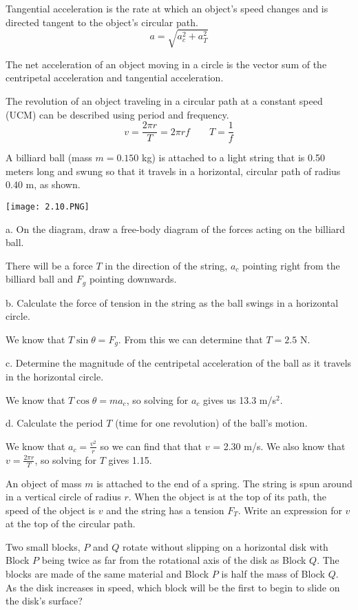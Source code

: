 \documentclass[../mech.tex]{subfiles}
\begin{document}
Tangential acceleration is the rate at which an object's speed changes and is directed tangent to the object's circular path. 
\[a=\sqrt{a_c^2+a_T^2}\]

The net acceleration of an object moving in a circle is the vector sum of the centripetal acceleration and tangential acceleration.

The revolution of an object traveling in a circular path at a constant speed (UCM) can be described using period and frequency.
\[v=\frac{2\pi r}{T}=2\pi r f \qquad T=\frac{1}{f}\]

\begin{example}
    A billiard ball (mass $m=0.150$ kg) is attached to a light string that is 0.50 meters long and swung so that it travels in a horizontal, circular path of radius 0.40 m, as shown.
    \begin{center}
        \texttt{[image: 2.10.PNG]}
    \end{center}

    a. On the diagram, draw a free-body diagram of the forces acting on the billiard ball.    

    There will be a force $T$ in the direction of the string, $a_c$ pointing right from the billiard ball and $F_g$ pointing downwards.

    b. Calculate the force of tension in the string as the ball swings in a horizontal circle.

    We know that $T\sin\theta = F_g$. From this we can determine that $T=2.5$ N.

    c. Determine the magnitude of the centripetal acceleration of the ball as it travels in the horizontal circle.

    We know that $T\cos\theta = ma_c$, so solving for $a_c$ gives us 13.3 m/s$^2$.

    d. Calculate the period $T$ (time for one revolution) of the ball's motion. 

    We know that $a_c=\frac{v^2}{r}$ so we can find that that $v$ = 2.30 m/s. We also know that $v=\frac{2\pi r}{T}$, so solving for $T$ gives 1.15.
\end{example}
\ex An object of mass $m$ is attached to the end of a spring. The string is spun around in a vertical circle of radius $r$. When the object is at the top of its path, the speed of the object is $v$ and the string has a tension $F_T$. Write an expression for $v$ at the top of the circular path.

\ex Two small blocks, $P$ and $Q$ rotate without slipping on a horizontal disk with Block $P$ being twice as far from the rotational axis of the disk as Block $Q$. The blocks are made of the same material and Block $P$ is half the mass of Block $Q$. As the disk increases in speed, which block will be the first to begin to slide on the disk's surface?
\end{document}
